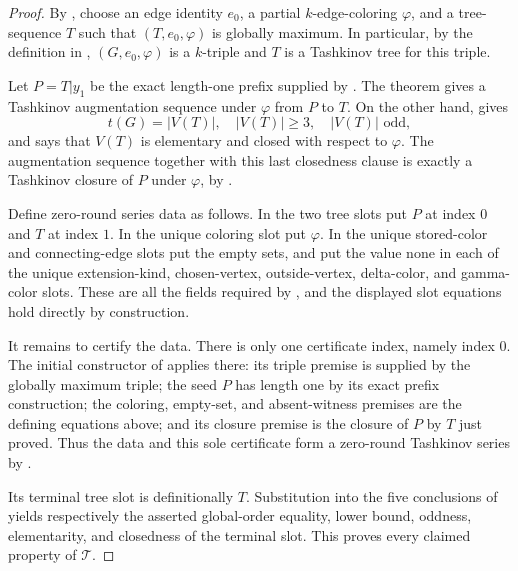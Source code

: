 \begin{proof}
By , choose an edge identity \(e_0\),
a partial \(k\)-edge-coloring \(\varphi\), and a tree-sequence \(T\) such
that \((T,e_0,\varphi)\) is globally maximum.  In particular, by the
definition in , \((G,e_0,\varphi)\) is a
\(k\)-triple and \(T\) is a Tashkinov tree for this triple.

Let \(P=T|y_1\) be the exact length-one prefix supplied by
.  The theorem
 gives a Tashkinov augmentation
sequence under \(\varphi\) from \(P\) to \(T\).  On the other hand,
 gives
\[
 t(G)=|V(T)|,\quad |V(T)|\geq3,\quad |V(T)|\text{ odd},
\]
and says that \(V(T)\) is elementary and closed with respect to
\(\varphi\).  The augmentation sequence together with this last closedness
clause is exactly a Tashkinov closure of \(P\) under \(\varphi\), by
.

Define zero-round series data as follows.  In the two tree slots put \(P\)
at index \(0\) and \(T\) at index \(1\).  In the unique coloring slot put
\(\varphi\).  In the unique stored-color and connecting-edge slots put the
empty sets, and put the value none in each of the unique extension-kind,
chosen-vertex, outside-vertex, delta-color, and gamma-color slots.  These
are all the fields required by , and the
displayed slot equations hold directly by construction.

It remains to certify the data.  There is only one certificate index,
namely index \(0\).  The initial constructor of
 applies there: its triple premise is supplied
by the globally maximum triple; the seed \(P\) has length one by its exact
prefix construction; the coloring, empty-set, and absent-witness premises
are the defining equations above; and its closure premise is the closure
of \(P\) by \(T\) just proved.  Thus the data and this sole certificate form
a zero-round Tashkinov series by .

Its terminal tree slot is definitionally \(T\).  Substitution into the
five conclusions of  yields respectively
the asserted global-order equality, lower bound, oddness, elementarity, and
closedness of the terminal slot.  This proves every claimed property of
\(\mathcal T\).
\end{proof}
